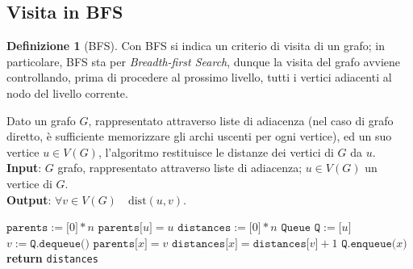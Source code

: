 \documentclass[14pt]{extreport}
\theoremstyle{definition}
\newtheorem{definition}{Definizione}[subsection]
\theoremstyle{definition}
\begin{document}
\subsection{Visita in BFS}

\begin{definition}[BFS]
    Con BFS si indica un criterio di visita di un grafo; in particolare, BFS sta per \textit{Breadth-first Search}, dunque la visita del grafo avviene controllando, prima di procedere al prossimo livello, tutti i vertici adiacenti al nodo del livello corrente.
\end{definition}

\begin{algorithm}[H]
    \caption{
        Dato un grafo $G$, rappresentato attraverso liste di adiacenza (nel caso di grafo diretto, è sufficiente memorizzare gli archi uscenti per ogni vertice), ed un suo vertice $u \in V(G)$, l'algoritmo restituisce le distanze dei vertici di $G$ da $u$.\\
        \textbf{Input}: $G$ grafo, rappresentato attraverso liste di adiacenza; $u \in V(G)$ un vertice di $G$.\\
        \textbf{Output}: $\forall v \in V(G) \quad \mathrm{dist}(u, v)$.
    }

    \begin{algorithmic}[1]
        \label{bfs}

            \State $\texttt{parents}:=\texttt{[}0\texttt{]} * n$
            \State $\texttt{parents[}u\texttt{]} = u$
            \State $\texttt{distances}:=\texttt{[}0\texttt{]} * n$
            \State $\texttt{Queue Q} := \texttt{[}u\texttt{]}$
                \State $v := \texttt{Q.dequeue()}$
                    \State $\texttt{parents[}x\texttt{]} = v$
                    \State $\texttt{distances[}x\texttt{]}=\texttt{distances[}v\texttt{]} + 1$
                    \State $\texttt{Q.enqueue(}x\texttt{)}$
                \EndIf
                \EndFor
            \EndWhile
            \State \textbf{return} \texttt{distances}
        \EndFunction
    \end{algorithmic}
\end{algorithm}
\end{document}
